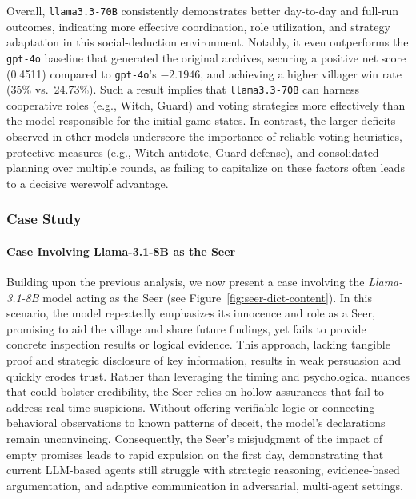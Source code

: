 Overall, \texttt{llama3.3-70B} consistently demonstrates better day-to-day and full-run outcomes, 
indicating more effective coordination, role utilization, and strategy adaptation in this 
social-deduction environment. Notably, it even outperforms the \texttt{gpt-4o} baseline 
that generated the original archives, securing a positive net score (0.4511) compared to 
\texttt{gpt-4o}’s $-2.1946$, and achieving a higher villager win rate (35\% vs.\ 24.73\%). 
Such a result implies that \texttt{llama3.3-70B} can harness cooperative roles 
(e.g., Witch, Guard) and voting strategies more effectively than the model 
responsible for the initial game states. In contrast, the larger deficits observed 
in other models underscore the importance of reliable voting heuristics, 
protective measures (e.g., Witch antidote, Guard defense), and consolidated planning 
over multiple rounds, as failing to capitalize on these factors often leads 
to a decisive werewolf advantage.
\subsubsection{Case Study}
\label{sec:detailed-results-case-study}
\paragraph{Case Involving Llama-3.1-8B as the Seer}
\label{appendix:case1}
Building upon the previous analysis, we now present a case involving the \textit{Llama-3.1-8B} model acting as the Seer (see Figure~\ref{fig:seer-dict-content}). In this scenario, the model repeatedly emphasizes its innocence and role as a Seer, promising to aid the village and share future findings, yet fails to provide concrete inspection results or logical evidence. This approach, lacking tangible proof and strategic disclosure of key information, results in weak persuasion and quickly erodes trust. Rather than leveraging the timing and psychological nuances that could bolster credibility, the Seer relies on hollow assurances that fail to address real-time suspicions. Without offering verifiable logic or connecting behavioral observations to known patterns of deceit, the model’s declarations remain unconvincing. Consequently, the Seer’s misjudgment of the impact of empty promises leads to rapid expulsion on the first day, demonstrating that current LLM-based agents still struggle with strategic reasoning, evidence-based argumentation, and adaptive communication in adversarial, multi-agent settings.

